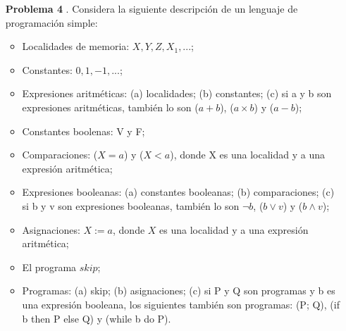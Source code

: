 \documentclass{article}
\begin{document}
\begin{enumerate}


\item[\bf{Problema 4}].
Considera la siguiente descripción de un lenguaje de programación simple:
\begin{itemize}
\item Localidades de memoria: $X, Y, Z, X_1 , . . .$;
\item Constantes: $0, 1, -1, ...$;
\item Expresiones aritméticas: (a) localidades; (b) constantes; (c) si a y b son expresiones
aritméticas, también lo son ($a + b$), ($a \times b$) y ($a-b$);
\item Constantes boolenas: V y F;
\item Comparaciones: ($X = a$) y ($X < a$), donde X es una localidad y a una expresión
aritmética;
\item Expresiones booleanas: (a) constantes booleanas; (b) comparaciones; (c) si b y v son
expresiones booleanas, también lo son $\neg b$, ($b \vee v$) y ($b \wedge v$);
\item Asignaciones: $X := a$, donde $X$ es una localidad y a una expresión aritmética;
\item El programa $skip$;
\item Programas: (a) skip; (b) asignaciones; (c) si P y Q son programas y b es una expresión booleana, los siguientes también son programas: (P; Q), (if b then P else Q) y (while b do P).
\end{itemize}


\end{enumerate}
\end{document}
